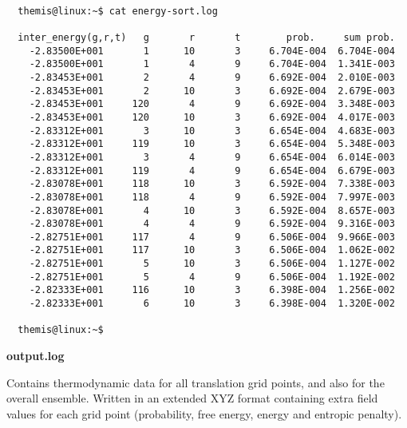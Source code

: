 \documentclass{achemso}
\begin{document}
\begin{center}
  \begin{minipage}{0.65\textwidth}
    \vskip0.25cm
    \begin{verbatim}

  themis@linux:~$ cat energy-sort.log

  inter_energy(g,r,t)   g       r       t        prob.     sum prob.
    -2.83500E+001       1      10       3     6.704E-004  6.704E-004
    -2.83500E+001       1       4       9     6.704E-004  1.341E-003
    -2.83453E+001       2       4       9     6.692E-004  2.010E-003
    -2.83453E+001       2      10       3     6.692E-004  2.679E-003
    -2.83453E+001     120       4       9     6.692E-004  3.348E-003
    -2.83453E+001     120      10       3     6.692E-004  4.017E-003
    -2.83312E+001       3      10       3     6.654E-004  4.683E-003
    -2.83312E+001     119      10       3     6.654E-004  5.348E-003
    -2.83312E+001       3       4       9     6.654E-004  6.014E-003
    -2.83312E+001     119       4       9     6.654E-004  6.679E-003
    -2.83078E+001     118      10       3     6.592E-004  7.338E-003
    -2.83078E+001     118       4       9     6.592E-004  7.997E-003
    -2.83078E+001       4      10       3     6.592E-004  8.657E-003
    -2.83078E+001       4       4       9     6.592E-004  9.316E-003
    -2.82751E+001     117       4       9     6.506E-004  9.966E-003
    -2.82751E+001     117      10       3     6.506E-004  1.062E-002
    -2.82751E+001       5      10       3     6.506E-004  1.127E-002
    -2.82751E+001       5       4       9     6.506E-004  1.192E-002
    -2.82333E+001     116      10       3     6.398E-004  1.256E-002
    -2.82333E+001       6      10       3     6.398E-004  1.320E-002

  themis@linux:~$ 

    \end{verbatim}
  \end{minipage}%
\end{center}

\textbf{output.log}

  Contains thermodynamic data for all translation grid points, and also for the
  overall ensemble. Written in an extended XYZ format containing extra field values 
  for each grid point (probability, free energy, energy and entropic penalty). \\~
\end{document}
